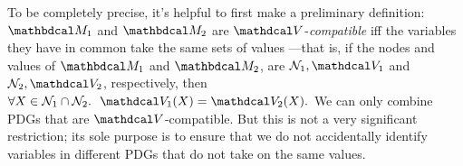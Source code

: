 To be completely precise, it's helpful to first make a preliminary definition:	
$\dg M_1$ and $\dg M_2$ are $\V$-\emph{compatible}
iff the variables they have in common take the same sets of values%
---that is, if the nodes and values of $\dg M_1$ and $\dg M_2$,
are $\N_1, \V_1$ and $\N_2, \V_2$, respectively, then
$
\forall X \in \N_1 \cap \N_2.~~
	\V_1( X) = \V_2 (X). $
%
%
%
We can only combine PDGs that are $\V$-compatible. 
But this is not a very significant restriction;
its sole purpose is to ensure that we do not accidentally identify variables in different PDGs that do not take on the same values. 
%

